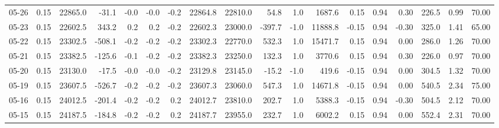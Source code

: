 \begin{threeparttable}
{\begin{tabular}{lrrrrrrrrrrrrrrrrr}
  05-26 &     0.15 & 22865.0 &             -31.1 &              -0.0 &               -0.0 &               -0.2 & 22864.8 & 22810.0 &       54.8 &                      1.0 &              1687.6 &       0.15 &      0.94 &           0.30 &            226.5 &            0.99 &                  70.00 \\
  05-23 &     0.15 & 22602.5 &             343.2 &               0.2 &                0.2 &               -0.2 & 22602.3 & 23000.0 &     -397.7 &                     -1.0 &             11888.8 &      -0.15 &      0.94 &          -0.30 &            325.0 &            1.41 &                  65.00 \\
  05-22 &     0.15 & 23302.5 &            -508.1 &              -0.2 &               -0.2 &               -0.2 & 23302.3 & 22770.0 &      532.3 &                      1.0 &             15471.7 &       0.15 &      0.94 &           0.00 &            286.0 &            1.26 &                  70.00 \\
  05-21 &     0.15 & 23382.5 &            -125.6 &              -0.1 &               -0.2 &               -0.2 & 23382.3 & 23250.0 &      132.3 &                      1.0 &              3770.6 &       0.15 &      0.94 &           0.30 &            226.0 &            0.97 &                  70.00 \\
  05-20 &     0.15 & 23130.0 &             -17.5 &              -0.0 &               -0.0 &               -0.2 & 23129.8 & 23145.0 &      -15.2 &                     -1.0 &               419.6 &      -0.15 &      0.94 &           0.00 &            304.5 &            1.32 &                  70.00 \\
  05-19 &     0.15 & 23607.5 &            -526.7 &              -0.2 &               -0.2 &               -0.2 & 23607.3 & 23060.0 &      547.3 &                      1.0 &             14671.8 &      -0.15 &      0.94 &           0.00 &            540.5 &            2.34 &                  75.00 \\
  05-16 &     0.15 & 24012.5 &            -201.4 &              -0.2 &               -0.2 &                0.2 & 24012.7 & 23810.0 &      202.7 &                      1.0 &              5388.3 &      -0.15 &      0.94 &          -0.30 &            504.5 &            2.12 &                  70.00 \\
  05-15 &     0.15 & 24187.5 &            -184.8 &              -0.2 &               -0.2 &                0.2 & 24187.7 & 23955.0 &      232.7 &                      1.0 &              6002.2 &       0.15 &      0.94 &           0.00 &            552.4 &            2.31 &                  70.00 \\

\end{tabular}}
\end{threeparttable}
